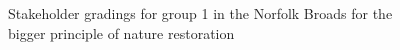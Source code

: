 \documentclass[
  12pt,
  letterpaper,
  DIV=11,
  numbers=noendperiod]{scrartcl}
\begin{document}
\begin{figure}[H]


\caption{\label{fig-BroadsBigG1}Stakeholder gradings for group 1 in the
Norfolk Broads for the bigger principle of nature restoration}

\end{figure}%
\end{document}
